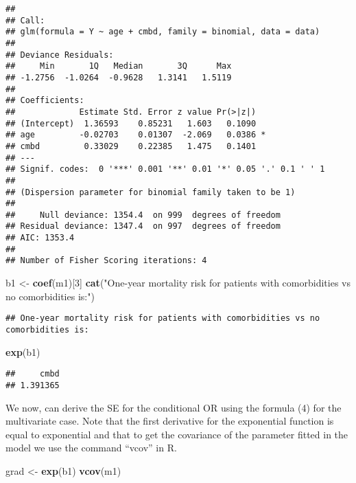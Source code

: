 \documentclass[
]{article}
\newenvironment{Shaded}{\begin{snugshade}}{\end{snugshade}}
\newcommand{\DecValTok}[1]{\textcolor[rgb]{0.00,0.00,0.81}{#1}}
\newcommand{\KeywordTok}[1]{\textcolor[rgb]{0.13,0.29,0.53}{\textbf{#1}}}
\newcommand{\NormalTok}[1]{#1}
\newcommand{\StringTok}[1]{\textcolor[rgb]{0.31,0.60,0.02}{#1}}
\begin{document}
\begin{verbatim}
## 
## Call:
## glm(formula = Y ~ age + cmbd, family = binomial, data = data)
## 
## Deviance Residuals: 
##     Min       1Q   Median       3Q      Max  
## -1.2756  -1.0264  -0.9628   1.3141   1.5119  
## 
## Coefficients:
##             Estimate Std. Error z value Pr(>|z|)  
## (Intercept)  1.36593    0.85231   1.603   0.1090  
## age         -0.02703    0.01307  -2.069   0.0386 *
## cmbd         0.33029    0.22385   1.475   0.1401  
## ---
## Signif. codes:  0 '***' 0.001 '**' 0.01 '*' 0.05 '.' 0.1 ' ' 1
## 
## (Dispersion parameter for binomial family taken to be 1)
## 
##     Null deviance: 1354.4  on 999  degrees of freedom
## Residual deviance: 1347.4  on 997  degrees of freedom
## AIC: 1353.4
## 
## Number of Fisher Scoring iterations: 4
\end{verbatim}

\begin{Shaded}
\begin{Highlighting}[]
\NormalTok{b1 <-}\StringTok{ }\KeywordTok{coef}\NormalTok{(m1)[}\DecValTok{3}\NormalTok{]}
\KeywordTok{cat}\NormalTok{(}\StringTok{"One-year mortality risk for patients with comorbidities vs no comorbidities is:"}\NormalTok{) }
\end{Highlighting}
\end{Shaded}

\begin{verbatim}
## One-year mortality risk for patients with comorbidities vs no comorbidities is:
\end{verbatim}

\begin{Shaded}
\begin{Highlighting}[]
\KeywordTok{exp}\NormalTok{(b1)}
\end{Highlighting}
\end{Shaded}

\begin{verbatim}
##     cmbd 
## 1.391365
\end{verbatim}

We now, can derive the SE for the conditional OR using the formula (4)
for the multivariate case. Note that the first derivative for the
exponential function is equal to exponential and that to get the
covariance of the parameter fitted in the model we use the command
``vcov'' in R.

\begin{Shaded}
\begin{Highlighting}[]
\NormalTok{grad <-}\StringTok{ }\KeywordTok{exp}\NormalTok{(b1)}
\KeywordTok{vcov}\NormalTok{(m1)}
\end{Highlighting}
\end{Shaded}
\end{document}

